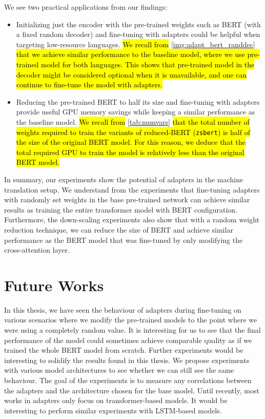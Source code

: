 We see two practical applications from our findings:
\begin{itemize}
    \item Initializing just the encoder with the pre-trained weights such as BERT (with a fixed random decoder) and fine-tuning with adapters could be helpful when targeting low-resource languages. \hl{We recall from} \cref{img:adapt_bert_randdec} \hl{that we achieve similar performance to the baseline model, where we use pre-trained model for both languages. This shows that pre-trained model in the decoder might be considered optional when it is unavailable, and one can continue to fine-tune the model with adapters.}
    \item Reducing the pre-trained BERT to half its size and fine-tuning with adapt\-ers provide useful GPU memory savings while keeping a similar performance as the baseline model. \hl{We recall from} \cref{tab:numvars} \hl{that the total number of weights required to train the variants of reduced-BERT (\texttt{zsbert}) is half of the size of the original BERT model. For this reason, we deduce that the total required GPU to train the model is relatively less than the original BERT model.}
\end{itemize}

In summary, our experiments show the potential of adapters in the machine translation setup. We understand from the experiments that fine-tuning adapters with randomly set weights in the base pre-trained network can achieve similar results as training the entire transformer model with BERT configuration. Furthermore, the down-scaling experiments also show that with a random weight reduction technique, we can reduce the size of BERT and achieve similar performance as the BERT model that was fine-tuned by only modifying the cross-attention layer.

\section{Future Works}
In this thesis, we have seen the behaviour of adapters during fine-tuning on various scenarios where we modify the pre-trained models to the point where we were using a completely random value. It is interesting for us to see that the final performance of the model could sometimes achieve comparable quality as if we trained the whole BERT model from scratch. Further experiments would be interesting to solidify the results found in this thesis. We propose experiments with various model architectures to see whether we can still see the same behaviour. The goal of the experiments is to measure any correlations between the adapters and the architecture chosen for the base model. Until recently, most works in adapters only focus on transformer-based models. It would be interesting to perform similar experiments with LSTM-based models.

